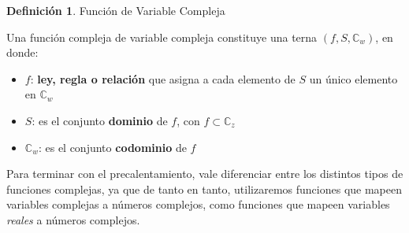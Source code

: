 \documentclass[12pt]{article}
\theoremstyle{definition}
\newtheorem{definition}{Definici\'on}[section]
\theoremstyle{theorem}
\begin{document}
\colorbox{magenta!40!white!80}{\parbox{\linewidth}{
\theoremstyle{definition}
\begin{definition}{Funci\'on de Variable Compleja}

Una funci\'on compleja de variable compleja constituye una terna $(f, S, \mathbb{C}_w)$, en donde:
\begin{itemize}
	\item $f$: \textbf{ley, regla o relaci\'on} que asigna a cada elemento de $S$ un \'unico elemento en $\mathbb{C}_w$
	\item $S$: es el conjunto \textbf{dominio} de $f$, con $f\subset \mathbb{C}_z$
	\item $\mathbb{C}_w$: es el conjunto \textbf{codominio} de $f$
\end{itemize}
\end{definition}
}}
\linebreak
\linebreak

Para terminar con el precalentamiento, vale diferenciar entre los distintos tipos de funciones complejas, ya que de tanto en tanto, utilizaremos funciones que mapeen variables complejas a n\'umeros complejos, como funciones que mapeen variables \textit{reales} a n\'umeros complejos.
\end{document}
